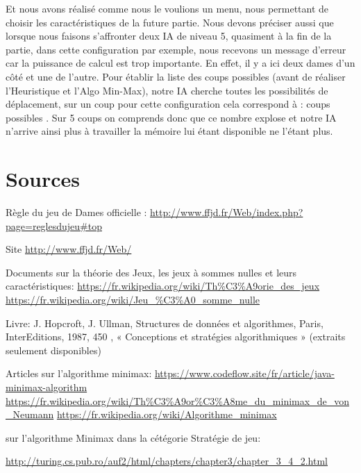 \documentclass[12,french]{report}
\begin{document}
Et nous avons réalisé comme nous le voulions un menu, nous permettant de choisir les caractéristiques de la future partie.
Nous devons préciser aussi que lorsque nous faisons s'affronter deux IA de niveau 5, quasiment à la fin de la partie, dans cette configuration par exemple, nous recevons un message d'erreur car la puissance de calcul est trop importante. En effet, il y a ici deux dames d'un côté et une de l'autre. Pour établir la liste des coups possibles (avant de réaliser l'Heuristique et l'Algo Min-Max), notre IA cherche toutes les possibilités de déplacement, sur un coup pour cette configuration cela correspond à : coups possibles . Sur 5 coups on comprends donc que ce nombre explose et notre IA n'arrive ainsi plus à travailler la mémoire lui étant disponible ne l'étant plus.



\listofalgorithms
\listoffigures

\chapter*{Sources}

Règle du jeu de Dames officielle : \url{http://www.ffjd.fr/Web/index.php?page=reglesdujeu#top}

Site 
\url{http://www.ffjd.fr/Web/}

Documents sur la théorie des Jeux, les jeux à sommes nulles et leurs caractéristiques:
\url {https://fr.wikipedia.org/wiki/Th%C3%A9orie_des_jeux}
\url {https://fr.wikipedia.org/wiki/Jeu_%C3%A0_somme_nulle}
	
Livre:
 J. Hopcroft, J. Ullman, Structures de données et algorithmes, Paris, InterEditions, 1987, 450 , « Conceptions et stratégies algorithmiques » (extraits seulement disponibles)
 
Articles sur l'algorithme minimax:
\url {https://www.codeflow.site/fr/article/java-minimax-algorithm}
\url {https://fr.wikipedia.org/wiki/Th%C3%A9or%C3%A8me_du_minimax_de_von_Neumann}
\url {https://fr.wikipedia.org/wiki/Algorithme_minimax}

sur l'algorithme Minimax dans la cétégorie Stratégie de jeu:

\url {http://turing.cs.pub.ro/auf2/html/chapters/chapter3/chapter_3_4_2.html}
\end{document}
